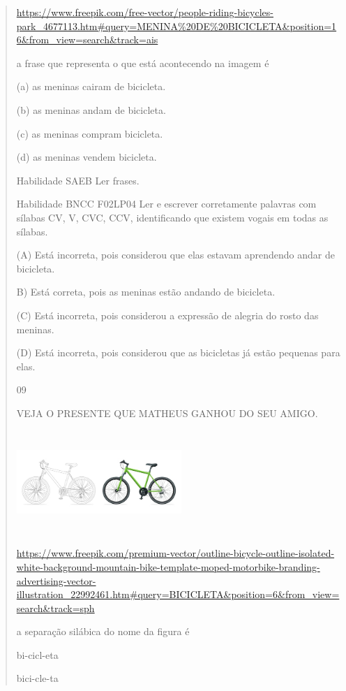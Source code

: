 {{{{\begin{verse}
{{\begin{escolha}
{{{{{\url{https://www.freepik.com/free-vector/people-riding-bicycles-park_4677113.htm\#query=MENINA\%20DE\%20BICICLETA\&position=16\&from_view=search\&track=ais}

a frase que representa o que está acontecendo na imagem é

(a) as meninas cairam de bicicleta.

(b) as meninas andam de bicicleta.

(c) as meninas compram bicicleta.

(d) as meninas vendem bicicleta.

Habilidade SAEB Ler frases.

Habilidade BNCC F02LP04 Ler e escrever corretamente palavras com sílabas
CV, V, CVC, CCV, identificando que existem vogais em todas as sílabas.

(A) Está incorreta, pois considerou que elas estavam aprendendo andar de
bicicleta.

B) Está correta, pois as meninas estão andando de bicicleta.

(C) Está incorreta, pois considerou a expressão de alegria do rosto das
meninas.

(D) Está incorreta, pois considerou que as bicicletas já estão pequenas
para elas.

\num{09}

VEJA O PRESENTE QUE MATHEUS GANHOU DO SEU AMIGO.

\includegraphics[width=2.46250in,height=1.54444in]{media/image180.jpeg}

\url{https://www.freepik.com/premium-vector/outline-bicycle-outline-isolated-white-background-mountain-bike-template-moped-motorbike-branding-advertising-vector-illustration_22992461.htm\#query=BICICLETA\&position=6\&from_view=search\&track=sph}

a separação silábica do nome da figura é

\begin{escolha}
\item bi-cicl-eta

\item bici-cle-ta


\end{escolha}}}}}}
\end{escolha}}}
\end{verse}}}}}

